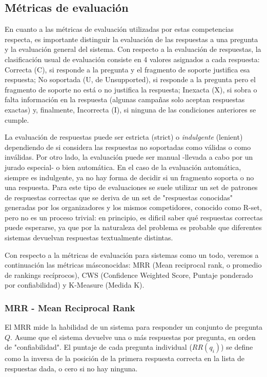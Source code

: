 \subsection{Métricas de evaluación}
\label{subsec:metricas}

En cuanto a las métricas de evaluación utilizadas por estas competencias respecta, es importante distinguir la evaluación de las respuestas a una pregunta y la evaluación general del sistema. Con respecto a la evaluación de respuestas, la clasificación usual de evaluación consiste en 4 valores asignados a cada respuesta: Correcta (C), si responde a la pregunta y el fragmento de soporte justifica esa respuesta; No soportada (U, de Unsupported), si responde a la pregunta pero el fragmento de soporte no está o no justifica la respuesta; Inexacta (X), si sobra o falta información en la respuesta (algunas campañas solo aceptan respuestas exactas) y, finalmente, Incorrecta (I), si ninguna de las condiciones anteriores se cumple. 

La evaluación de respuestas puede ser estricta (strict) o \textit{indulgente} (lenient) dependiendo de si considera las respuestas no soportadas como válidas o como inválidas. Por otro lado, la evaluación puede ser manual -llevada a cabo por un jurado especial- o bien automática. En el caso de la evaluación automática, siempre es indulgente, ya no hay forma de decidir si un fragmento soporta o no una respuesta. Para este tipo de evaluaciones se suele utilizar un set de patrones de respuestas correctas que se deriva de un set de "respuestas conocidas" generadas por los organizadores y los mismos competidores, conocido como R-set, pero no es un proceso trivial: en principio, es dificil saber qué respuestas correctas puede esperarse, ya que por la naturaleza del problema es probable que diferentes sistemas devuelvan respuestas textualmente distintas. 

Con respecto a la métricas de evaluación para sistemas como un todo, veremos a continuación las métricas másconocidas: MRR (Mean reciprocal rank, o promedio de rankings recíprocos), CWS (Confidence Weighted Score, Puntaje ponderado por confiabilidad) y K-Measure (Medida K).

\subsubsection*{MRR - Mean Reciprocal Rank}
El MRR mide la habilidad de un sistema para responder un conjunto de pregunta $Q$. Asume que el sistema devuelve una o más respuestas por pregunta, en orden de "confiabilidad". El puntaje de cada pregunta individual ($RR(q_i)$) se define como la inversa de la posición de la primera respuesta correcta en la lista de respuestas dada, o cero si no hay ninguna.

